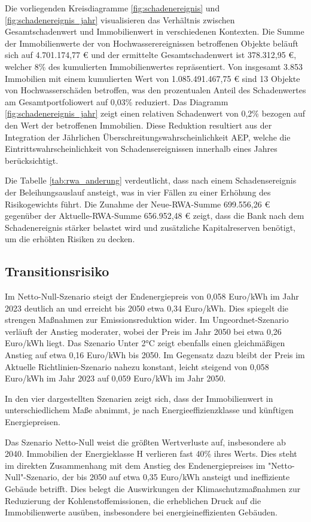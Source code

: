 Die vorliegenden Kreisdiagramme \ref{fig:schadenereignis} und \ref{fig:schadenereignis_jahr} visualisieren das Verhältnis zwischen Gesamtschadenwert und Immobilienwert in verschiedenen Kontexten. Die Summe der Immobilienwerte der von Hochwasserereignissen betroffenen Objekte beläuft sich auf 4.701.174,77 € und der ermittelte Gesamtschadenwert ist 378.312,95 €, welcher 8\% des kumulierten Immobilienwertes repräsentiert. Von insgesamt 3.853 Immobilien mit einem kumulierten Wert von 1.085.491.467,75 € sind 13 Objekte von Hochwasserschäden betroffen, was den prozentualen Anteil des Schadenwertes am Gesamtportfoliowert auf  0,03\% reduziert. Das Diagramm \ref{fig:schadenereignis_jahr} zeigt einen relativen Schadenwert von 0,2\% bezogen auf den Wert der betroffenen Immobilien. Diese Reduktion resultiert aus der Integration der Jährlichen Überschreitungswahrscheinlichkeit \ac{AEP}, welche die Eintrittswahrscheinlichkeit von Schadensereignissen innerhalb eines Jahres berücksichtigt.

Die Tabelle \ref{tab:rwa_anderung} verdeutlicht, dass nach einem Schadensereignis der Beleihungsauslauf ansteigt, was in vier Fällen zu einer Erhöhung des Risikogewichts  führt. Die Zunahme der Neue-RWA-Summe 699.556,26 € gegenüber der Aktuelle-RWA-Summe 656.952,48 € zeigt, dass die Bank nach dem Schadenereignis stärker belastet wird und zusätzliche Kapitalreserven benötigt, um die erhöhten Risiken zu decken.


\subsection{Transitionsrisiko}

Im Netto-Null-Szenario steigt der Endenergiepreis von 0,058 Euro/kWh im Jahr 2023 deutlich an und erreicht bis 2050 etwa 0,34 Euro/kWh. Dies spiegelt die strengen Maßnahmen zur Emissionsreduktion wider. Im Ungeordnet-Szenario verläuft der Anstieg moderater, wobei der Preis im Jahr 2050 bei etwa 0,26 Euro/kWh liegt. Das Szenario Unter 2°C zeigt ebenfalls einen gleichmäßigen Anstieg auf etwa 0,16 Euro/kWh bis 2050. Im Gegensatz dazu bleibt der Preis im Aktuelle Richtlinien-Szenario nahezu konstant, leicht steigend von 0,058 Euro/kWh im Jahr 2023 auf 0,059 Euro/kWh im Jahr 2050.

In den vier dargestellten Szenarien zeigt sich, dass der Immobilienwert in unterschiedlichem Maße abnimmt, je nach Energieeffizienzklasse und künftigen Energiepreisen. 

Das Szenario Netto-Null weist die größten Wertverluste auf, insbesondere ab 2040. Immobilien der Energieklasse H verlieren fast 40\% ihres Werts. Dies steht im direkten Zusammenhang mit dem Anstieg des Endenergiepreises im "Netto-Null"-Szenario, der bis 2050 auf etwa 0,35 Euro/kWh ansteigt und ineffiziente Gebäude betrifft. Dies belegt die Auswirkungen der Klimaschutzmaßnahmen zur Reduzierung der Kohlenstoffemissionen, die erheblichen Druck auf die Immobilienwerte ausüben, insbesondere bei energieineffizienten Gebäuden.

